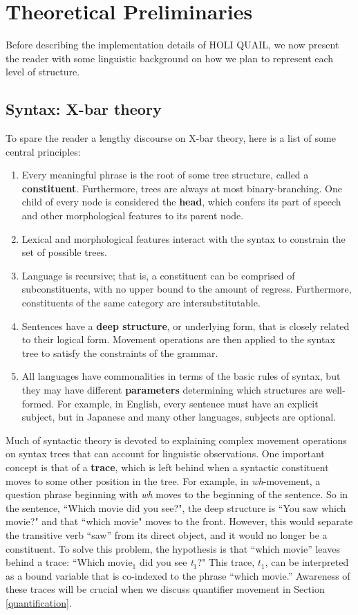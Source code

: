 \documentclass[11pt, oneside]{article}      %
\begin{document}
\section{Theoretical Preliminaries}

Before describing the implementation details of HOLI QUAIL, we now present the reader with some linguistic background on how we plan to represent each level of structure.

\subsection{Syntax: X-bar theory}

To spare the reader a lengthy discourse on X-bar theory, here is a list of some central principles:

\begin{enumerate}
\item Every meaningful phrase is the root of some tree structure, called a \textbf{constituent}.  Furthermore, trees are always at most binary-branching.  One child of every node is considered the \textbf{head}, which confers its part of speech and other morphological features to its parent node.
\item Lexical and morphological features interact with the syntax to constrain the set of possible trees.
\item Language is recursive; that is, a constituent can be comprised of subconstituents, with no upper bound to the amount of regress.  Furthermore, constituents of the same category are intersubstitutable.  
\item Sentences have a \textbf{deep structure}, or underlying form, that is closely related to their logical form.  Movement operations are then applied to the syntax tree to satisfy the constraints of the grammar.
\item All languages have commonalities in terms of the basic rules of syntax, but they may have different \textbf{parameters} determining which structures are well-formed.  For example, in English, every sentence must have an explicit subject, but in Japanese and many other languages, subjects are optional.
\end{enumerate}

Much of syntactic theory is devoted to explaining complex movement operations on syntax trees that can account for linguistic observations.  One important concept is that of a \textbf{trace}, which is left behind when a syntactic constituent moves to some other position in the tree.  For example, in \textit{wh}-movement, a question phrase beginning with \textit{wh} moves to the beginning of the sentence.  So in the sentence, ``Which movie did you see?", the deep structure is ``You saw which movie?" and that ``which movie" moves to the front.  However, this would separate the transitive verb ``saw'' from its direct object, and it would no longer be a constituent.  To solve this problem, the hypothesis is that ``which movie'' leaves behind a trace: ``Which movie$_1$ did you see \textit{t}$_1$?"  This trace, $t_1$, can be interpreted as a bound variable that is co-indexed to the phrase ``which movie.''  Awareness of these traces will be crucial when we discuss quantifier movement in Section \ref{quantification}.
\end{document}
